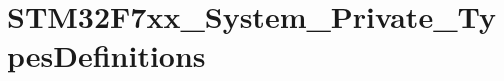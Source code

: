 \hypertarget{group___s_t_m32_f7xx___system___private___types_definitions}{}\section{S\+T\+M32\+F7xx\+\_\+\+System\+\_\+\+Private\+\_\+\+Types\+Definitions}
\label{group___s_t_m32_f7xx___system___private___types_definitions}
